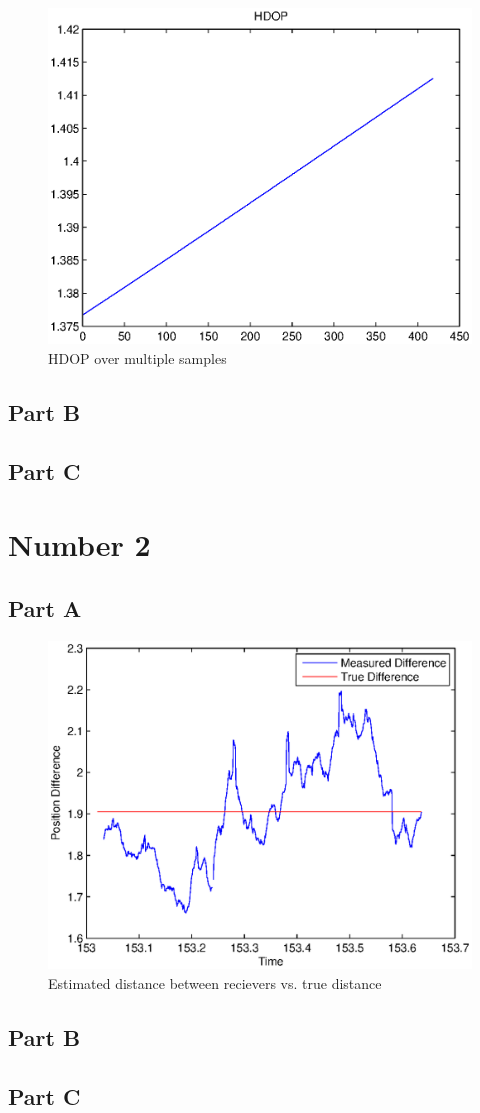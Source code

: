 \documentclass[11pt]{article} %
\begin{document}
\begin{figure}[h!t]
 \centering
    \includegraphics[width=5in]{part1aHDOP.eps}
    \caption{HDOP over multiple samples}
    \label{HDOP}
\end{figure}
\subsection{Part B}

\subsection{Part C}

\section{Number 2}

\subsection{Part A}
\begin{figure}[h!t]
 \centering
    \includegraphics[width=5in]{part2aerror.eps}
    \caption{Estimated distance between recievers vs. true distance}
    \label{dist}
\end{figure}
\subsection{Part B}

\subsection{Part C}
\end{document}
